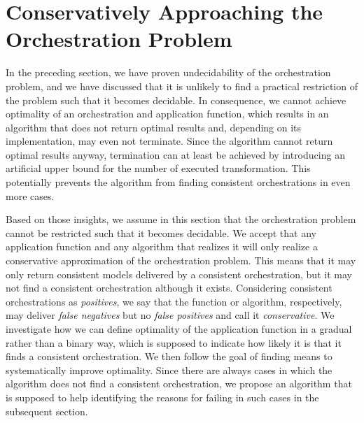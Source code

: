 \section{Conservatively Approaching the Orchestration Problem}

In the preceding section, we have proven undecidability of the orchestration problem, and we have discussed that it is unlikely to find a practical restriction of the problem such that it becomes decidable.
In consequence, we cannot achieve optimality of an orchestration and application function, which results in an 
algorithm that does not return optimal results and, depending on its implementation, may even not terminate.
Since the algorithm cannot return optimal results anyway, termination can at least be achieved by introducing an artificial upper bound for the number of executed transformation.
This potentially prevents the algorithm from finding consistent orchestrations in even more cases.

Based on those insights, we assume in this section that the orchestration problem cannot be restricted such that it becomes decidable.
We accept that any application function and any algorithm that realizes it will only realize a conservative approximation of the orchestration problem.
This means that it may only return consistent models delivered by a consistent orchestration, but it may not find a consistent orchestration although it exists.
Considering consistent orchestrations as \emph{positives}, we say that the function or algorithm, respectively, may deliver \emph{false negatives} but no \emph{false positives} and call it \emph{conservative}.
We investigate how we can define optimality of the application function in a gradual rather than a binary way, which is supposed to indicate how likely it is that it finds a consistent orchestration.
We then follow the goal of finding means to systematically improve optimality.
Since there are always cases in which the algorithm does not find a consistent orchestration, we propose an algorithm that is supposed to help identifying the reasons for failing in such cases in the subsequent section.


